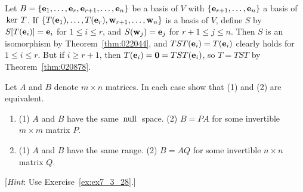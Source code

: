 \begin{multicols}{2}
\begin{ex}
\begin{sol}
Let $B = \{\textbf{e}_{1}, \dots, \textbf{e}_{r}, \textbf{e}_{r+1}, \dots, \textbf{e}_{n}\}$ be a basis of $V$ with $\{\textbf{e}_{r+1}, \dots, \textbf{e}_{n}\}$ a basis of $\thinspace\operatorname{ker \medspace}T$. If $\{T(\textbf{e}_{1}), \dots, T(\textbf{e}_{r}), \textbf{w}_{r+1}, \dots, \textbf{w}_{n}\}$ is a basis of $V$, define $S$ by $S[T(\textbf{e}_{i})] = \textbf{e}_{i}$ for $1 \leq i \leq r$, and $S(\textbf{w}_{j}) = \textbf{e}_{j}$ for $r + 1 \leq j \leq n$. Then $S$ is an isomorphism by Theorem~\ref{thm:022044}, and $TST(\textbf{e}_{i}) = T(\textbf{e}_{i})$ clearly holds for $1 \leq i \leq r$. But if $i \geq r + 1$, then $T(\textbf{e}_{i}) = \textbf{0} = TST(\textbf{e}_{i})$, so $T = TST$ by Theorem~\ref{thm:020878}.
\end{sol}
\end{ex}

\begin{ex}
Let $A$ and $B$ denote $m \times n$ matrices. In each case show that (1) and (2) are equivalent.


\begin{enumerate}[label={\alph*.}]
\item (1) $A$ and $B$ have the same $\thinspace\operatorname{null\medspace}$ space. (2) $B = PA$ for some invertible $m \times m$ matrix $P$.

\item (1) $A$ and $B$ have the same range. (2) $B = AQ$ for some invertible $n \times n$ matrix $Q$.

\end{enumerate}

[\textit{Hint}: Use Exercise~\ref{ex:ex7_3_28}.]
\end{ex}
\end{multicols}
